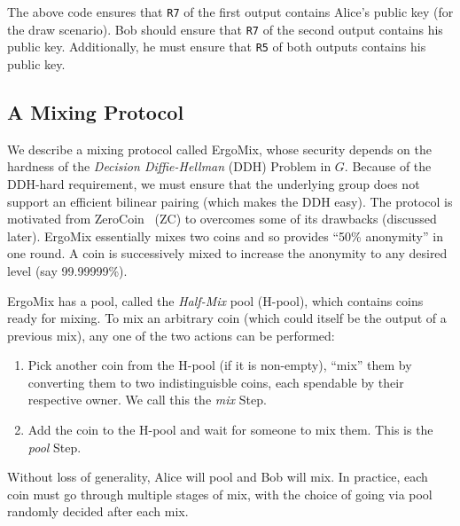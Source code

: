 \documentclass[11pt]{article}
\newcommand{\mixname}{ErgoMix\xspace}
\begin{document}

The above code ensures that \texttt{R7} of the first output contains Alice's public key (for the draw scenario). Bob should ensure that \texttt{R7} of the second output contains his public key. Additionally, he must ensure that \texttt{R5} of both outputs contains his public key.

\subsection{A Mixing Protocol}
\label{mix}

We describe a mixing protocol called \mixname, whose security depends on the hardness of the {\em Decision Diffie-Hellman} (DDH) Problem in $G$. Because of the DDH-hard requirement, we must ensure that the underlying group does not support an efficient bilinear pairing (which makes the DDH easy). The protocol is motivated from ZeroCoin~\cite{zerocoin} (ZC) to overcomes some of its drawbacks (discussed later). 
\mixname essentially mixes two coins and so provides ``50\% anonymity'' in one round. A coin is successively mixed to increase the anonymity to any desired level (say 99.99999\%). 

\mixname has a pool, called the {\em Half-Mix} pool (H-pool), which contains coins ready for mixing. 
To mix an arbitrary coin (which could itself be the output of a previous mix), any one of the two actions can be performed:
\begin{enumerate}
	\item Pick another coin from the H-pool (if it is non-empty), ``mix'' them by converting them to two indistinguisble coins, each spendable by their respective owner. We call this the {\em mix} Step.
	\item Add the coin to the H-pool and wait for someone to mix them. This is the {\em pool} Step.
\end{enumerate}

Without loss of generality, Alice will pool and Bob will mix. In practice, each coin must go through multiple stages of mix, with the choice of going via pool randomly decided after each mix.
\end{document}
